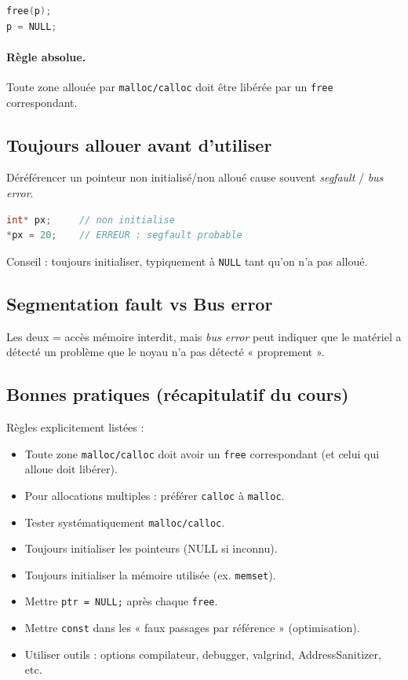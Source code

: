 \begin{lstlisting}[language=C]
free(p);
p = NULL;
\end{lstlisting}

\paragraph{Règle absolue.}
Toute zone allouée par \texttt{malloc/calloc} doit être libérée par un \texttt{free} correspondant. 

\subsection{Toujours allouer avant d’utiliser}
Déréférencer un pointeur non initialisé/non alloué cause souvent \textit{segfault} / \textit{bus error}. 

\begin{lstlisting}[language=C]
int* px;     // non initialise
*px = 20;    // ERREUR : segfault probable
\end{lstlisting}

Conseil : toujours initialiser, typiquement à \texttt{NULL} tant qu’on n’a pas alloué. 

\subsection{Segmentation fault vs Bus error}
Les deux = accès mémoire interdit, mais \textit{bus error} peut indiquer que le matériel
a détecté un problème que le noyau n’a pas détecté « proprement ».

\subsection{Bonnes pratiques (récapitulatif du cours)}
Règles explicitement listées : 
\begin{itemize}
  \item Toute zone \texttt{malloc/calloc} doit avoir un \texttt{free} correspondant (et celui qui alloue doit libérer).
  \item Pour allocations multiples : préférer \texttt{calloc} à \texttt{malloc}.
  \item Tester systématiquement \texttt{malloc/calloc}.
  \item Toujours initialiser les pointeurs (NULL si inconnu).
  \item Toujours initialiser la mémoire utilisée (ex. \texttt{memset}).
  \item Mettre \texttt{ptr = NULL;} après chaque \texttt{free}.
  \item Mettre \texttt{const} dans les « faux passages par référence » (optimisation).
  \item Utiliser outils : options compilateur, debugger, valgrind, AddressSanitizer, etc.
\end{itemize}

